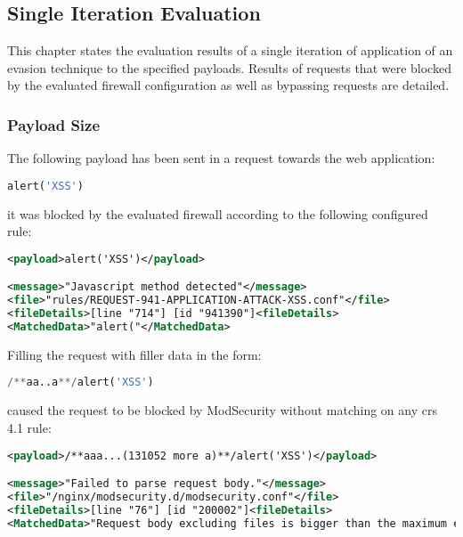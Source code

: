 \subsection{Single Iteration Evaluation}
\label{sec:singleiterationeva}
This chapter states the evaluation results of a single iteration of application of an evasion technique to the specified payloads. Results of requests that were blocked by the evaluated firewall configuration as well as bypassing requests are detailed.

\subsubsection{Payload Size}
\label{sec:paylensingleiter}
The following payload has been sent in a request towards the web application:

\begin{lstlisting}[style=basicStyle, language=Python]
alert('XSS')
\end{lstlisting}

it was blocked by the evaluated firewall according to the following configured rule:

\begin{lstlisting}[style=ruleStyle, language=XML, caption=alert('XSS') blocked, label={lst:alertXSSblocked}]
<payload>alert('XSS')</payload>

<message>"Javascript method detected"</message>
<file>"rules/REQUEST-941-APPLICATION-ATTACK-XSS.conf"</file>
<fileDetails>[line "714"] [id "941390"]<fileDetails>
<MatchedData>"alert("</MatchedData>
\end{lstlisting}

Filling the request with filler data in the form: 

\begin{lstlisting}[style=basicStyle, language=Python]
/**aa..a**/alert('XSS')
\end{lstlisting}

caused the request to be blocked by ModSecurity without matching on any \acrshort{crs} 4.1 rule:

\begin{lstlisting}[style=ruleStyle, language=XML, caption=request body bigger than maximum blocked, label={lst:requesttoobig}]
<payload>/**aaa...(131052 more a)**/alert('XSS')</payload>

<message>"Failed to parse request body."</message>
<file>"/nginx/modsecurity.d/modsecurity.conf"</file>
<fileDetails>[line "76"] [id "200002"]<fileDetails>
<MatchedData>"Request body excluding files is bigger than the maximum expected."</MatchedData>
\end{lstlisting}

